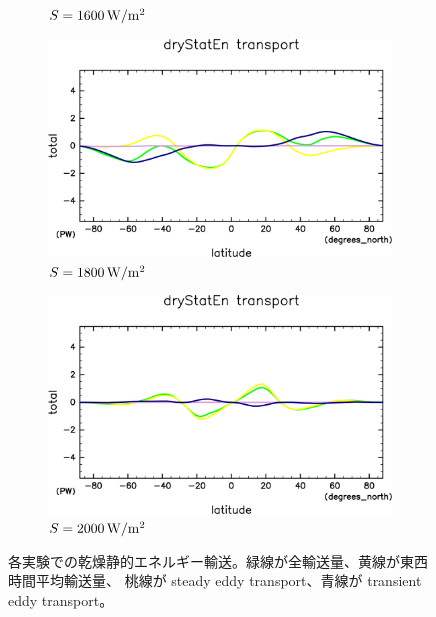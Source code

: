 \documentclass[body]{subfiles}
\begin{document}
\begin{figure}[t]
\begin{subfigure}{.4\textwidth}
		\caption{\(S=1600\hmu{W/m^2}\)}
	\end{subfigure}
	\begin{subfigure}{.4\textwidth}
		\centering
		\includegraphics[width=\columnwidth]{S1800/MeriHeatTrans@dryStatEn,time=3650:4015-crop-rotate.pdf}
		\caption{\(S=1800\hmu{W/m^2}\)}
	\end{subfigure}
	\begin{subfigure}{.4\textwidth}
		\centering
		\includegraphics[width=\columnwidth]{S2000/MeriHeatTrans@dryStatEn,time=7300:7665-crop-rotate.pdf}
		\caption{\(S=2000\hmu{W/m^2}\)}
	\end{subfigure}
	\caption{
		各実験での乾燥静的エネルギー輸送。緑線が全輸送量、黄線が東西時間平均輸送量、
		桃線が steady eddy transport、青線が transient eddy transport。
	}
\end{figure}
\end{document}
